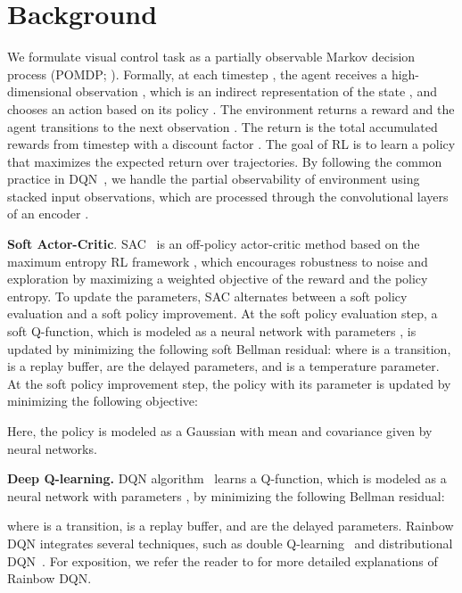 \documentclass{article}
\begin{document}
\section{Background} \label{sec:background}
We formulate visual control task as a partially observable Markov decision process (POMDP; \citealt{sutton2018reinforcement, kaelbling1998planning}).
Formally, at each timestep , the agent receives a high-dimensional observation , which is an indirect representation of the state , and chooses an action  based on its policy .
The environment returns a reward  and the agent transitions to the next observation .
The return  is the total accumulated rewards from timestep  with a discount factor .
The goal of RL is to learn a policy  that maximizes the expected return over trajectories.
By following the common practice in DQN~\citep{mnih2015human}, we handle the partial observability of environment using stacked input observations, which are processed through the convolutional layers of an encoder .

{\bf Soft Actor-Critic}. SAC~\citep{haarnoja2018soft} is an off-policy actor-critic method based on the maximum entropy RL framework \citep{ziebart2010modeling}, which encourages robustness to noise and exploration by maximizing a weighted objective of the reward and the policy entropy.
To update the parameters, SAC alternates between a soft policy evaluation and a soft policy improvement.
At the soft policy evaluation step,
a soft Q-function, which is modeled as a neural network with parameters , is updated by minimizing the following soft Bellman residual:
 \label{eq:sac_critic_tot} 
where  is a transition,
 is a replay buffer,
 are the delayed parameters,
and  is a temperature parameter.
At the soft policy improvement step,
the policy  with its parameter  is updated by minimizing the following objective:

Here, the policy is modeled as a Gaussian with mean and covariance given by neural networks.

{\bf Deep Q-learning.} DQN algorithm~\citep{mnih2015human} learns a Q-function, which is modeled as a neural network with parameters ,
by minimizing the following Bellman residual:

where  is a transition,
 is a replay buffer, 
and  are the delayed parameters.
Rainbow DQN integrates several techniques,
such as double Q-learning~\citep{van2016deep} and distributional DQN~\citep{bellemare2017distributional}.
For exposition, we refer the reader to \citet{hessel2018rainbow} for more detailed explanations of Rainbow DQN.
\end{document}
